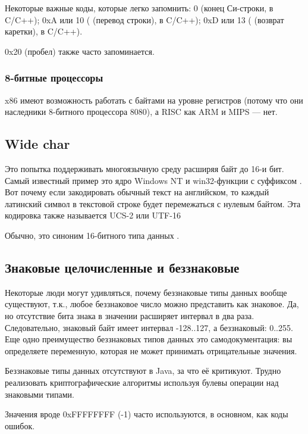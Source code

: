 Некоторые важные коды, которые легко запомнить:
0 (конец Си-строки,  в C/C++);
0xA или 10 ( (перевод строки),  в C/C++);
0xD или 13 ( (возврат каретки),  в C/C++).

0x20 (пробел) также часто запоминается.

\subsubsection{8-битные процессоры}

x86 имеют возможность работать с байтами на уровне регистров (потому что они наследники 8-битного процессора 8080),
а RISC как ARM и MIPS --- нет.

\subsection{Wide char}

Это попытка поддерживать многоязычную среду расширяя байт до 16-и бит.
Самый известный пример это ядро Windows NT и win32-функции с суффиксом .
Вот почему если закодировать обычный текст на английском,
то каждый латинский символ в текстовой строке будет перемежаться с нулевым байтом.
Эта кодировка также называется UCS-2 или UTF-16

Обычно,  это синоним 16-битного типа данных .

\subsection{Знаковые целочисленные и беззнаковые}

Некоторые люди могут удивляться, почему беззнаковые типы данных вообще существуют, т.к., любое беззнаковое число
можно представить как знаковое.
Да, но отсутствие бита знака в значении расширяет интервал в два раза.
Следовательно, знаковый байт имеет интервал -128..127, а беззнаковый: 0..255.
Еще одно преимущество беззнаковых типов данных это самодокументация:
вы определяете переменную, которая не может принимать отрицательные значения.

Беззнаковые типы данных отсутствуют в Java, за что её критикуют.
Трудно реализовать криптографические алгоритмы используя булевы операции над знаковыми типами.

Значения вроде 0xFFFFFFFF (-1) часто используются, в основном, как коды ошибок.

